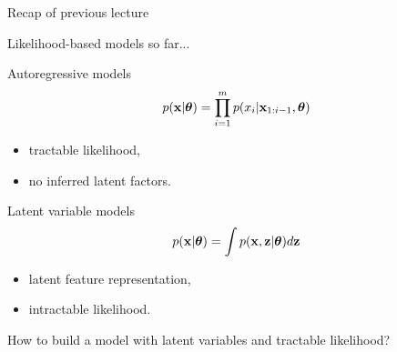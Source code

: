 

\begin{frame}
\titlepage
\end{frame}
\begin{frame}{Recap of previous lecture}
	\begin{block}{Likelihood-based models so far...}
	\begin{minipage}[t]{0.5\columnwidth}
		\begin{block}{Autoregressive models}
			\vspace{-0.5cm}
			\[
			p(\mathbf{x}|\boldsymbol{\theta}) = \prod_{i=1}^m p(x_i | \mathbf{x}_{1:i - 1}, \boldsymbol{\theta})
			\]
			\vspace{-0.2cm}
			\begin{itemize}
				\item tractable likelihood, 
				\item no inferred latent factors.
			\end{itemize}
		\end{block}
	\end{minipage}%
	\begin{minipage}[t]{0.5\columnwidth}
		\begin{block}{Latent variable models}
			\[
			p(\mathbf{x}| \boldsymbol{\theta}) = \int p(\mathbf{x}, \mathbf{z} | \boldsymbol{\theta}) d \mathbf{z}
			\]
			\begin{itemize}
				\item latent feature representation, 
				\item intractable likelihood.
			\end{itemize}
		\end{block}
	\end{minipage}
	\end{block}
	
	\vspace{1cm } 
	How to build a model with latent variables and tractable likelihood?
\end{frame}
